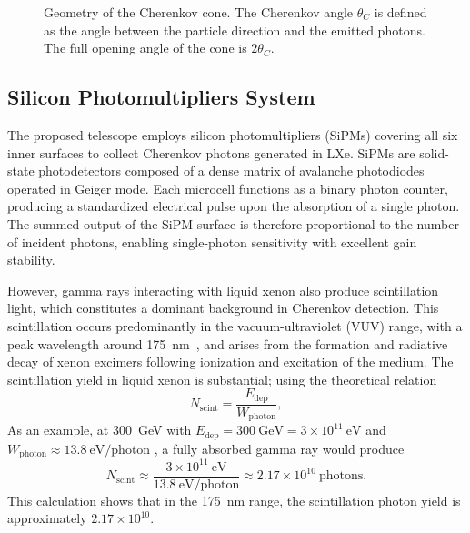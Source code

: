\documentclass{aastex701}
\begin{document}
\begin{figure}[h!]
    \centering
    \caption{Geometry of the Cherenkov cone. The Cherenkov angle $\theta_C$ is defined as the angle between the particle direction and the emitted photons. The full opening angle of the cone is $2\theta_C$.}
    \label{fig:cherenkov}
\end{figure}

\subsection{Silicon Photomultipliers System}

The proposed telescope employs silicon photomultipliers (SiPMs) covering all six inner surfaces to collect Cherenkov photons generated in LXe. SiPMs are solid-state photodetectors composed of a dense matrix of avalanche photodiodes operated in Geiger mode. Each microcell functions as a binary photon counter, producing a standardized electrical pulse upon the absorption of a single photon. The summed output of the SiPM surface is therefore proportional to the number of incident photons, enabling single-photon sensitivity with excellent gain stability. 

However, gamma rays interacting with liquid xenon also produce scintillation light, which constitutes a dominant background in Cherenkov detection. This scintillation occurs predominantly in the vacuum-ultraviolet (VUV) range, with a peak wavelength around 175~nm~\cite{Aprile2012}, and arises from the formation and radiative decay of xenon excimers following ionization and excitation of the medium. The scintillation yield in liquid xenon is substantial; using the theoretical relation
\[
N_\mathrm{scint} = \frac{E_\mathrm{dep}}{W_\mathrm{photon}},
\]
As an example, at 300~GeV with \(E_\mathrm{dep} = 300~\mathrm{GeV} = 3\times10^{11}~\mathrm{eV}\) and \(W_\mathrm{photon} \approx 13.8~\mathrm{eV/photon}\) \cite{DokeMasuda2002}, a fully absorbed gamma ray would produce
\[
N_\mathrm{scint} \approx \frac{3\times10^{11}~\mathrm{eV}}{13.8~\mathrm{eV/photon}} \approx 2.17 \times 10^{10}~\text{photons}.
\]
This calculation shows that in the 175~nm range, the scintillation photon yield is approximately $2.17 \times 10^{10}$.
\end{document}
